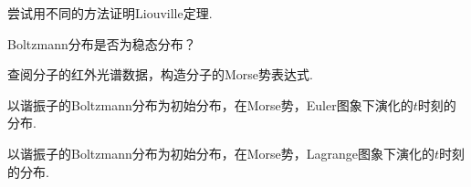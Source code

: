    \begin{asg}
        尝试用不同的方法证明Liouville定理.
    \end{asg}
    \begin{asg}
        Boltzmann分布是否为稳态分布？
    \end{asg}
    \begin{asg}
        查阅分子的红外光谱数据，构造分子的Morse势表达式.
    \end{asg}
    \begin{asg}
        以谐振子的Boltzmann分布为初始分布，在Morse势，Euler图象下演化的$t$时刻的分布.
    \end{asg}
    \begin{asg}
        以谐振子的Boltzmann分布为初始分布，在Morse势，Lagrange图象下演化的$t$时刻的分布.
    \end{asg}

    
    
